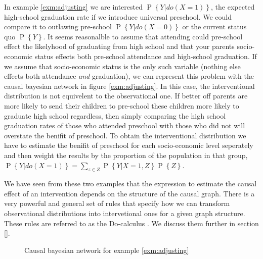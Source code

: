 \documentclass[11pt,a4paper,oneside]{book}
\renewcommand{\P}[1]{\operatorname{P}\left\{#1\right\}}
\theoremstyle{plain}
\theoremstyle{definition}
\begin{document}
In example \ref{exm:adjusting} we are interested $\P{Y|do(X=1)}$, the expected high-school graduation rate if we introduce universal preschool. We could compare it to outlawing pre-school $\P{Y|do(X=0)}$ or the current status quo $\P{Y}$. It seems reasonalble to assume that attending could pre-school effect the likelyhood of graduating from high school and that your parents socio-economic status effects both pre-school attendance and high-school graduation. If we assume that socio-economic status is the only such variable (nothing else effects both attendance \emph{and} graduation), we can represent this problem with the causal bayesian network in figure \ref{exm:adjusting}. In this case, the interventional distribution is not equivelent to the observational one. If better off parents are more likely to send their children to pre-school these children more likely to graduate high school regardless, then simply comparing the high school graduation rates of those who attended preschool with those who did not will overstate the benifit of preschool. To obtain the interventional distribution we have to estimate the benifit of preschool for each socio-economic level seperately and then weight the results by the proportion of the population in that group, $\P{Y|do(X=1)} = \sum_{z \in Z}\P{Y|X=1,Z}\P{Z}$. 

We have seen from these two examples that the expression to estimate the causal effect of an intervention depends on the structure of the causal graph. There is a very powerful and general set of rules that specify how we can transform observational distributions into intervetional ones for a given graph structure. These rules are referred to as the Do-calculus \cite{Pearl2000}. We discuss them further in section \ref{}. 


\begin{figure}
\center
\caption{Causal bayesian network for example \ref{exm:adjusting}}
\label{fig:causal_adjust}
\end{figure}
\end{document}
